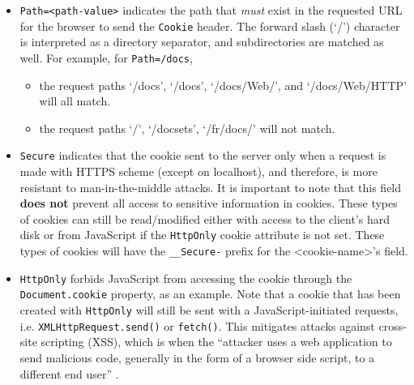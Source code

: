 \documentclass[
    paper=letter,
    parskip=half,
    fontsize=12pt,
    titlepage=firstiscover,
    toc=bibliography,
    numbers=endperiod
]{scrartcl}
\providecommand{\tightlist}{%
  \setlength{\itemsep}{0pt}\setlength{\parskip}{0pt}}
\begin{document}
\begin{itemize}
    \item \texttt{Path=\textless path-value\textgreater{}} indicates the path
          that \emph{must} exist in the requested URL for the browser to send
          the \texttt{Cookie} header. The forward slash (`/') character is interpreted
          as a directory separator, and subdirectories are matched as well. For
          example, for \texttt{Path=/docs},
          \begin{itemize}
              \tightlist
              \item the request paths `/docs', `/docs', `/docs/Web/', and `/docs/Web/HTTP'
                    will all match.
              \item the request paths `/', `/docsets', `/fr/docs/' will not match.
          \end{itemize}

    \item \texttt{Secure} indicates that the cookie sent to the server only when
          a request is made with HTTPS scheme (except on localhost), and
          therefore, is more resistant to man-in-the-middle attacks. It is
          important to note that this field \textbf{does not} prevent all access
          to sensitive information in cookies. These types of cookies can still
          be read/modified either with access to the client's hard disk or from
          JavaScript if the \texttt{HttpOnly} cookie attribute is not set. These types
          of cookies will have the \texttt{\_\_Secure-} prefix for the
          \textless cookie-name\textgreater's field.

    \item \texttt{HttpOnly} forbids JavaScript from accessing the cookie through
          the \texttt{Document.cookie} property, as an example. Note that a cookie that
          has been created with \texttt{HttpOnly} will still be sent with a
          JavaScript-initiated requests, i.e. \texttt{XMLHttpRequest.send()} or
          \texttt{fetch()}. This mitigates attacks against cross-site scripting (XSS),
          which is when the ``attacker uses a web application to send malicious
          code, generally in the form of a browser side script, to a different
          end user'' \cite{owasp-xss}.


\end{itemize}
\end{document}
